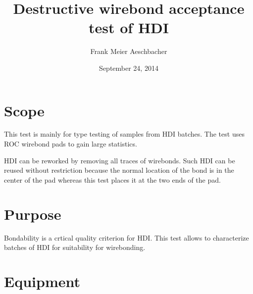 \documentclass[10pt]{unlsilabsop}
\title{Destructive wirebond acceptance test of HDI}
\date{September 24, 2014}
\author{Frank Meier Aeschbacher}
\begin{document}
\maketitle

\section{Scope}
This test is mainly for type testing of samples from HDI batches. The test uses ROC wirebond pads to gain large statistics.

HDI can be reworked by removing all traces of wirebonds. Such HDI can be reused without restriction because the normal location of the bond is in the center of the pad whereas this test places it at the two ends of the pad.

\section{Purpose}
Bondability is a crtical quality criterion for HDI. This test allows to characterize batches of HDI for suitability for wirebonding.



\section{Equipment}
\end{document}
